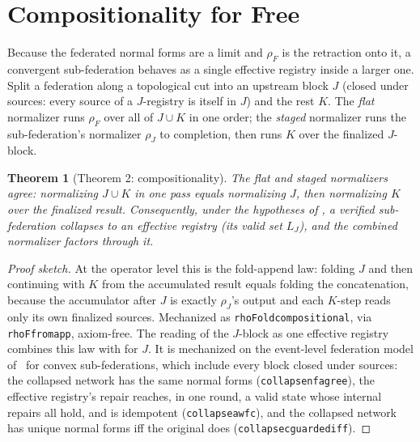 \documentclass[11pt,a4paper]{article}
\theoremstyle{plain}
\newtheorem{theorem}{Theorem}[section]
\theoremstyle{definition}
\theoremstyle{remark}
\renewcommand{\_}{\origunderscore\allowbreak}
\begin{document}
\section{Compositionality for Free}
\label{sec:compose}

Because the federated normal forms are a limit and $\rho_F$ is the retraction onto it, a convergent
sub-federation behaves as a single effective registry inside a larger one. Split a federation along a
topological cut into an upstream block $J$ (closed under sources: every source of a $J$-registry is
itself in $J$) and the rest $K$. The \emph{flat} normalizer runs $\rho_F$ over all of $J \cup K$ in
one order; the \emph{staged} normalizer runs the sub-federation's normalizer $\rho_J$ to completion,
then runs $K$ over the finalized $J$-block.

\begin{theorem}[Theorem 2: compositionality]
\label{thm:two}
The flat and staged normalizers agree: normalizing $J \cup K$ in one pass equals normalizing $J$,
then normalizing $K$ over the finalized result. Consequently, under the hypotheses of
, a verified sub-federation collapses to an effective registry (its valid set $L_J$),
and the combined normalizer factors through it.
\end{theorem}
\begin{proof}[Proof sketch]
At the operator level this is the fold-append law: folding $J$ and then continuing with $K$ from the
accumulated result equals folding the concatenation, because the accumulator after $J$ is exactly
$\rho_J$'s output and each $K$-step reads only its own finalized sources. Mechanized as
\texttt{rhoFold\_compositional}, via \texttt{rhoF\_from\_app}, axiom-free. The reading of the
$J$-block as one effective registry combines this law with  for $J$. It is mechanized
on the event-level federation model of~\cite{blackwell2026federated} for convex sub-federations,
which include every block closed under sources: the collapsed network has the same normal forms
(\texttt{collapse\_nf\_agree}), the effective registry's repair reaches, in one round, a valid state
whose internal repairs all hold, and is idempotent (\texttt{collapse\_a\_wfc}), and the collapsed network has unique normal
forms iff the original does (\texttt{collapse\_c\_guarded\_iff}).
\end{proof}
\end{document}
